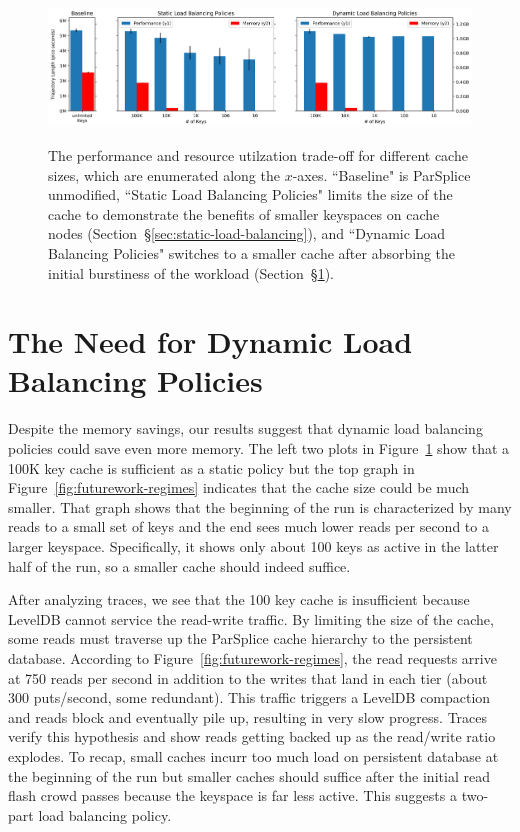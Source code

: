 \begin{figure}[tbh]
  \noindent\includegraphics[width=1\textwidth]{figures/methodology-tradeoff.png}\\
  \caption{The performance and resource utilzation trade-off for different
  cache sizes, which are enumerated along the \(x\)-axes. ``Baseline" is
  ParSplice unmodified, ``Static Load Balancing Policies" limits the size of the
  cache to demonstrate the benefits of smaller keyspaces on cache nodes
  (Section~\S\ref{sec:static-load-balancing}), and ``Dynamic Load Balancing
  Policies" switches to a smaller cache after absorbing the initial burstiness of
  the workload
  (Section~\S\ref{sec:the-need-for-dynamic-load-balancing-policies}).
  \label{fig:methodology-tradeoff}}
\end{figure}

\section{The Need for Dynamic Load Balancing Policies}
\label{sec:the-need-for-dynamic-load-balancing-policies}

Despite the memory savings, our results suggest that dynamic load balancing
policies could save even more memory.  The left two plots in
Figure~\ref{fig:methodology-tradeoff} show that a 100K key cache is sufficient
as a static policy but the top graph in Figure~\ref{fig:futurework-regimes}
indicates that the cache size could be much smaller. That graph shows that the
beginning of the run is characterized by many reads to a small set of keys and
the end sees much lower reads per second to a larger keyspace. Specifically, it
shows only about 100 keys as active in the latter half of the run, so a smaller
cache should indeed suffice. 

After analyzing traces, we see that the 100 key cache is insufficient because
LevelDB cannot service the read-write traffic. By limiting the size of the
cache, some reads must traverse up the ParSplice cache hierarchy to the
persistent database.  According to Figure~\ref{fig:futurework-regimes}, the
read requests arrive at 750 reads per second in addition to the writes that
land in each tier (about 300 puts/second, some redundant). This traffic
triggers a LevelDB compaction and reads block and eventually pile up, resulting
in very slow progress. Traces verify this hypothesis and show reads getting
backed up as the read/write ratio explodes. To recap, small caches incurr too
much load on persistent database  at the beginning of the run but smaller caches should
suffice after the initial read flash crowd passes because the keyspace is far
less active. This suggests a two-part load balancing policy.

